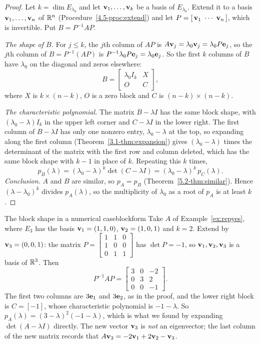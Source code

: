 \documentclass[11pt]{article}
\begin{document}
\begin{proof}
Let $k=\dim E_{\lambda_0}$ and let $\mathbf{v}_1,\dots,\mathbf{v}_k$ be a basis of $E_{\lambda_0}$. Extend it to a basis $\mathbf{v}_1,\dots,\mathbf{v}_n$ of $\mathbb{R}^n$ (Procedure~\ref{4.5-proc:extend}) and let $P=[\,\mathbf{v}_1\ \cdots\ \mathbf{v}_n\,]$, which is invertible. Put $B=P^{-1}AP$.

\emph{The shape of $B$.} For $j\le k$, the $j$th column of $AP$ is $A\mathbf{v}_j=\lambda_0\mathbf{v}_j=\lambda_0P\mathbf{e}_j$, so the $j$th column of $B=P^{-1}(AP)$ is $P^{-1}\lambda_0P\mathbf{e}_j=\lambda_0\mathbf{e}_j$. So the first $k$ columns of $B$ have $\lambda_0$ on the diagonal and zeros elsewhere:
\[
B=\begin{bmatrix}\lambda_0I_k&X\\O&C\end{bmatrix},
\]
where $X$ is $k\times(n-k)$, $O$ is a zero block and $C$ is $(n-k)\times(n-k)$.

\emph{The characteristic polynomial.} The matrix $B-\lambda I$ has the same block shape, with $(\lambda_0-\lambda)I_k$ in the upper left corner and $C-\lambda I$ in the lower right. The first column of $B-\lambda I$ has only one nonzero entry, $\lambda_0-\lambda$ at the top, so expanding along the first column (Theorem~\ref{3.1-thm:expansion}) gives $(\lambda_0-\lambda)$ times the determinant of the matrix with the first row and column deleted, which has the same block shape with $k-1$ in place of $k$. Repeating this $k$ times,
\[
p_B(\lambda)=(\lambda_0-\lambda)^k\det(C-\lambda I)=(\lambda_0-\lambda)^k\,p_C(\lambda).
\]
\emph{Conclusion.} $A$ and $B$ are similar, so $p_A=p_B$ (Theorem~\ref{5.2-thm:similar}). Hence $(\lambda-\lambda_0)^k$ divides $p_A(\lambda)$, so the multiplicity of $\lambda_0$ as a root of $p_A$ is at least $k$.
\end{proof}

\begin{exmp}{The block shape in a numerical case}{blockform}
Take $A$ of Example~\ref{ex:repyes}, where $E_3$ has the basis $\mathbf{v}_1=(1,1,0)$, $\mathbf{v}_2=(1,0,1)$ and $k=2$. Extend by $\mathbf{v}_3=(0,0,1)$: the matrix $P=\begin{bmatrix}1&1&0\\1&0&0\\0&1&1\end{bmatrix}$ has $\det P=-1$, so $\mathbf{v}_1,\mathbf{v}_2,\mathbf{v}_3$ is a basis of $\mathbb{R}^3$. Then
\[
P^{-1}AP=\begin{bmatrix}3&0&-2\\0&3&2\\0&0&-1\end{bmatrix}.
\]
The first two columns are $3\mathbf{e}_1$ and $3\mathbf{e}_2$, as in the proof, and the lower right block is $C=[-1]$, whose characteristic polynomial is $-1-\lambda$. So $p_A(\lambda)=(3-\lambda)^2(-1-\lambda)$, which is what we found by expanding $\det(A-\lambda I)$ directly. The new vector $\mathbf{v}_3$ is \emph{not} an eigenvector; the last column of the new matrix records that $A\mathbf{v}_3=-2\mathbf{v}_1+2\mathbf{v}_2-\mathbf{v}_3$.
\end{exmp}
\end{document}
